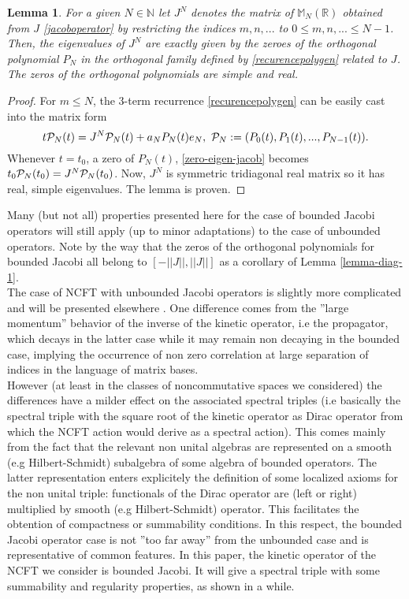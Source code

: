 \documentclass[a4paper,11pt,twoside]{article}
\numberwithin{equation}{section}
\newtheorem{lemma}[Theorem]{Lemma}
\theoremstyle{nonumberplain}
\newtheorem{proof}{Proof}
\newcounter{and}
\begin{document}
\begin{lemma}\label{lemma-spectral}
For a given $N\in\mathbb{N}$ let $J^N$ denotes the matrix of $\mathbb{M}_N(\mathbb{R})$ obtained from $J$ \eqref{jacoboperator} by restricting the indices $m,n,...$ to $0\le m,n,...\le N-1$. Then, the eigenvalues of $J^N$ are exactly given by the zeroes of the orthogonal polynomial $P_N$ in the orthogonal family defined by \eqref{recurencepolygen} related to $J$. The zeros of the orthogonal polynomials are simple and real.
\end{lemma}\label{lemma-diag-1}
\begin{proof}
For $m\le N$, the 3-term recurrence \eqref{recurencepolygen} can be easily cast into the matrix form 
\begin{equation}
t{\cal{P}}_N(t)=J^N{\cal{P}}_N(t)+a_NP_N(t)e_N,\ {\cal{P}}_N:=(P_0(t),P_1(t),...,P_{N-1}(t))\label{zero-eigen-jacob}.
\end{equation}
Whenever $t=t_0$, a zero of $P_N(t)$, \eqref{zero-eigen-jacob} becomes $t_0{\cal{P}}_N(t_0)=J^N{\cal{P}}_N(t_0)$. Now, $J^N$ is symmetric tridiagonal real matrix so it has real, simple eigenvalues. The lemma is proven.
\end{proof}
Many (but not all) properties presented here for the case of bounded Jacobi operators will still apply (up to minor adaptations) to the case of unbounded operators. Note by the way that the zeros of the orthogonal polynomials for bounded Jacobi all belong to $[-||J||,||J||]$ as a corollary of Lemma \ref{lemma-diag-1}.\\
The case of NCFT with unbounded Jacobi operators is slightly more complicated and will be presented elsewhere \cite{unboud-jac}. One difference comes from the ''large momentum'' behavior of the inverse of the kinetic operator, i.e the propagator, which decays in the latter case while it may remain non decaying in the bounded case, implying the occurrence of non zero correlation at large separation of indices in the language of matrix bases.\\
However (at least in the classes of noncommutative spaces we considered) the differences have a milder effect on the associated spectral triples (i.e basically the spectral triple with the square root of the kinetic operator as Dirac operator from which the NCFT action would derive as a spectral action). This comes mainly from the fact that the relevant non unital algebras are represented on a smooth (e.g Hilbert-Schmidt) subalgebra of some algebra of bounded operators. The latter representation enters explicitely the definition of some localized axioms for the non unital triple: functionals of the Dirac operator are (left or right) multiplied by smooth (e.g Hilbert-Schmidt) operator. This facilitates the obtention of compactness or summability conditions. In this respect, the bounded Jacobi operator case is not ''too far away'' from the unbounded case and is representative of common features. In this paper, the kinetic operator of the NCFT we consider is bounded Jacobi. It will give a spectral triple with 
some summability and regularity properties, as shown in a while.\par
\end{document}
